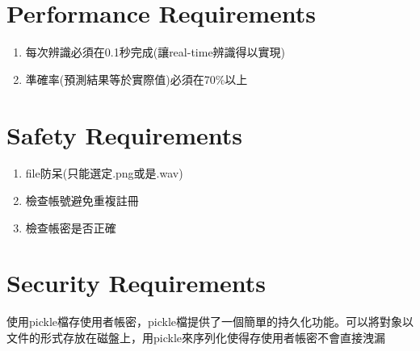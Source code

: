 \documentclass{scrreprt}
\begin{document}
\begin{CJK*}{UTF8}{bsmi}
\section{Performance Requirements}
\begin{enumerate}
\item 每次辨識必須在0.1秒完成(讓real-time辨識得以實現)
\item 準確率(預測結果等於實際值)必須在70\%以上
\end{enumerate}

\section{Safety Requirements}
\begin{enumerate}
\item file防呆(只能選定.png或是.wav)
\item 檢查帳號避免重複註冊
\item 檢查帳密是否正確
\end{enumerate}

\section{Security Requirements}
使用pickle檔存使用者帳密，pickle檔提供了一個簡單的持久化功能。可以將對象以文件的形式存放在磁盤上，用pickle來序列化使得存使用者帳密不會直接洩漏


\end{CJK*}
\end{document}
